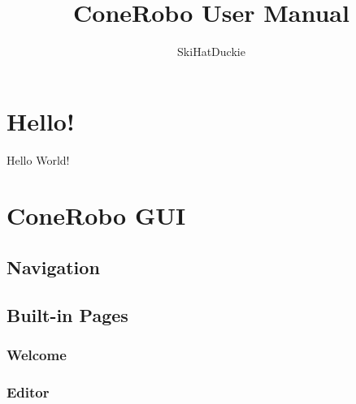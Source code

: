 \documentclass[11pt]{article}
\title{ConeRobo User Manual}
\author{SkiHatDuckie}
\begin{document}
   \maketitle
   \newpage

   \tableofcontents
   \newpage

   \section{Hello!}
   Hello World!

   \section{ConeRobo GUI}
   \subsection{Navigation}
   \subsection{Built-in Pages}
   \subsubsection{Welcome}
   \subsubsection{Editor}
\end{document}
